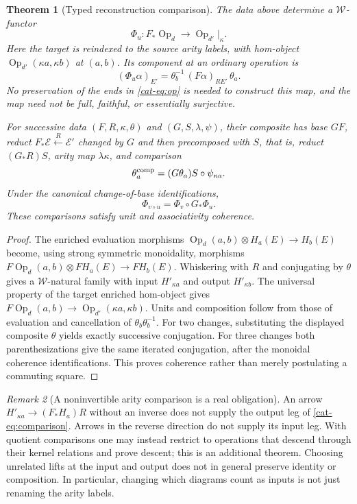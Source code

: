 \documentclass[11pt]{article}
\newtheorem{theorem}{Theorem}[section]
\theoremstyle{definition}
\theoremstyle{remark}
\newtheorem{remark}[theorem]{Remark}
\newcommand{\W}{\mathcal W}
\newcommand{\E}{\mathcal E}
\newcommand{\Op}{\operatorname{Op}}
\begin{document}
\begin{theorem}[Typed reconstruction comparison]\label{cat-thm:base}
The data above determine a $\W$-functor
\begin{equation}\label{cat-eq:comparison}
 \Phi_u:F_*\Op_d\longrightarrow \Op_{d'}|_\kappa.
\end{equation}
Here the target is reindexed to the source arity labels, with hom-object
$\Op_{d'}(\kappa a,\kappa b)$ at $(a,b)$. Its component at an ordinary operation is
\[
 (\Phi_u\alpha)_{E'}=
 \theta_b^{-1}\,(F\alpha)_{R E'}\,\theta_a.
\]
No preservation of the ends in \eqref{cat-eq:op} is needed to construct this
map, and the map need not be full, faithful, or essentially surjective.

For successive data $(F,R,\kappa,\theta)$ and
$(G,S,\lambda,\psi)$, their composite has base $GF$, reduct
$F_*\E\xleftarrow{R}\E'$ changed by $G$ and then precomposed with $S$,
that is, reduct $(G_*R)S$, arity map $\lambda\kappa$, and comparison
\[
 \theta^{\rm comp}_a=(G\theta_a)S\circ\psi_{\kappa a}.
\]
Under the canonical change-of-base identifications,
\begin{equation}\label{cat-eq:basecomposition}
 \Phi_{v\circ u}=\Phi_v\circ G_*\Phi_u.
\end{equation}
These comparisons satisfy unit and associativity coherence.
\end{theorem}
\begin{proof}
The enriched evaluation morphisms
$\Op_d(a,b)\otimes H_a(E)\to H_b(E)$ become, using strong
symmetric monoidality, morphisms
$F\Op_d(a,b)\otimes FH_a(E)\to FH_b(E)$.
Whiskering with $R$ and conjugating by $\theta$ gives a $\W$-natural
family with input $H'_{\kappa a}$ and output $H'_{\kappa b}$.
The universal property of the target enriched hom-object gives
$F\Op_d(a,b)\to\Op_{d'}(\kappa a,\kappa b)$.
Units and composition follow from those of evaluation and cancellation of
$\theta_b\theta_b^{-1}$. For two changes, substituting the displayed
composite $\theta$ yields exactly successive conjugation. For three
changes both parenthesizations give the same iterated conjugation, after
the monoidal coherence identifications. This proves coherence rather
than merely postulating a commuting square.
\end{proof}

\begin{remark}[A noninvertible arity comparison is a real obligation]
An arrow $H'_{\kappa a}\to(F_*H_a)R$ without an inverse does not supply
the output leg of \eqref{cat-eq:comparison}. Arrows in the reverse direction
do not supply its input leg. With quotient comparisons one may instead
restrict to operations that descend through their kernel relations and
prove descent; this is an additional theorem. Choosing unrelated lifts
at the input and output does not in general preserve identity or
composition. In particular, changing which diagrams count as inputs is
not just renaming the arity labels.
\end{remark}
\end{document}
